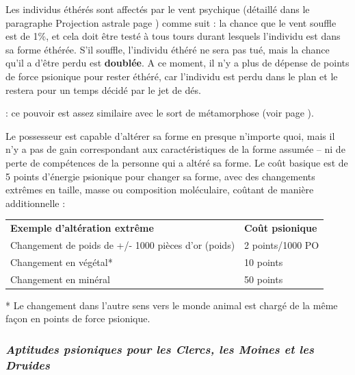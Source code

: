 \documentclass[11pt]{article}
\newcommand{\uline}[1]{\underline{\smash{#1}\vphantom{T}}\vphantom{#1}}
\begin{document}
{\bigskip

Les individus éthérés sont affectés par le vent psychique (détaillé dans le paragraphe Projection astrale page \pageref{guerrier-projection-astrale}) comme suit : la chance que le vent souffle est de 1\%, et cela doit être testé à tous tours durant lesquels l'individu est dans sa forme éthérée. S'il souffle, l'individu éthéré ne sera pas tué, mais la chance qu'il a d'être perdu est \textbf{doublée}. A ce moment, il n'y a plus de dépense de points de force psionique pour rester éthéré, car l'individu est perdu dans le plan et le restera pour un temps décidé par le jet de dés.

\bigskip

\textbf{\uline{Altération de la forme (spécial)}} : ce pouvoir est assez similaire avec le sort de métamorphose (voir page \pageref{sort-metamorphose}).

\bigskip

Le possesseur est capable d'altérer sa forme en presque n'importe quoi, mais il n'y a pas de gain correspondant aux caractéristiques de la forme assumée -- ni de perte de compétences de la personne qui a altéré sa forme. Le coût basique est de 5 points d'énergie psionique pour changer sa forme, avec des changements extrêmes en taille, masse ou composition moléculaire, coûtant de manière additionnelle :

\bigskip

\begin{tabular}{ll}
\textbf{Exemple d'altération extrême} & \textbf{Coût psionique} \\
Changement de poids de +/- 1000 pièces d'or (poids) & 2 points/1000 PO \\
Changement en végétal* & 10 points \\
Changement en minéral & 50 points \\
\end{tabular}

\bigskip

* Le changement dans l'autre sens vers le monde animal est chargé de la même façon en points de force psionique.



\newpage
\subsubsection*{\textit{Aptitudes psioniques pour les Clercs, les Moines et les Druides}}

}
\end{document}
